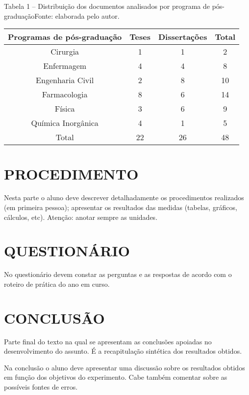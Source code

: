 \jump

\begin{container}{10cm}{Tabela 1 – Distribuição dos documentos analisados por programa de pós-graduação}{Fonte: elaborada pelo autor.}
\begin{center}
\begin{tabular}{ | c | c | c | c | }
    \hline
    Programas de pós-graduação & Teses & Dissertações & Total\\
    \hline
    \hline
    Cirurgia & 1 & 1 & 2 \\
    \hline
    Enfermagem & 4 & 4 & 8 \\
    \hline
    Engenharia Civil & 2 & 8 & 10 \\
    \hline
    Farmacologia & 8 & 6 & 14 \\
    \hline
    Física & 3 & 6 & 9 \\
    \hline
    Química Inorgânica & 4 & 1 & 5 \\
    \hline
    Total & 22 & 26 & 48 \\
    \hline
\end{tabular} 
\end{center}
\end{container}

\section{PROCEDIMENTO}
Nesta parte o aluno deve descrever detalhadamente os procedimentos realizados (em primeira pessoa); apresentar os resultados das medidas (tabelas, gráficos, cálculos, etc). Atenção: anotar sempre as unidades.


\section{QUESTIONÁRIO}
No questionário devem constar as perguntas e as respostas de acordo com o roteiro de prática do ano em curso. 


\section{CONCLUSÃO}
Parte final do texto na qual se apresentam as conclusões apoiadas no desenvolvimento do assunto. É a recapitulação sintética dos resultados obtidos. 

Na conclusão o aluno deve apresentar uma discussão sobre os resultados obtidos em função dos objetivos do experimento. Cabe também comentar sobre as possíveis fontes de erros.

